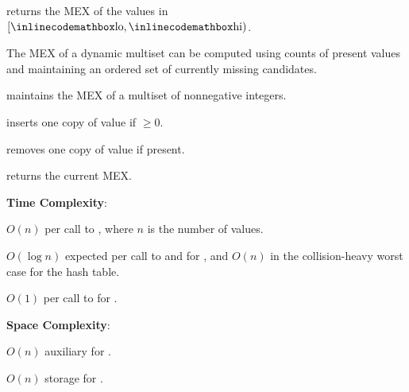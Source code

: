 \begin{compactitem}
  \item {} returns the MEX of the values in $[{\inlinecodemath{lo}}, {\inlinecodemath{hi}})$.
\end{compactitem}

The MEX of a dynamic multiset can be computed using counts of present values and maintaining an ordered set of currently missing candidates.

\begin{compactitem}
  \item {} maintains the MEX of a multiset of nonnegative integers.
  \item {} inserts one copy of value  if  $\geq 0$.
  \item {} removes one copy of value  if present.
  \item {} returns the current MEX.
\end{compactitem}

\textbf{Time Complexity}:
\begin{compactitem}
  \item $O(n)$ per call to , where $n$ is the number of values.
  \item $O(\log n)$ expected per call to  and  for , and $O(n)$ in the collision-heavy worst case for the hash table.
  \item $O(1)$ per call to  for .
\end{compactitem}

\textbf{Space Complexity}:
\begin{compactitem}
  \item $O(n)$ auxiliary for .
  \item $O(n)$ storage for .
\end{compactitem}

